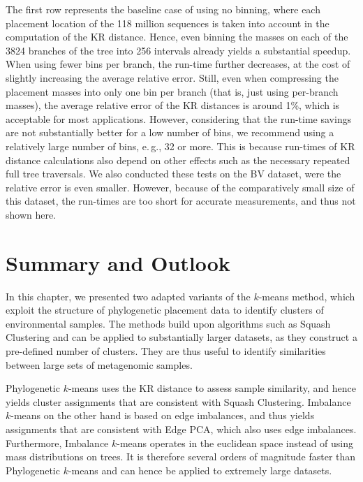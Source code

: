 The first row represents the baseline case of using no binning,
where each placement location of the \num{118} million sequences
is taken into account in the computation of the KR distance.
Hence, even binning the masses on each of the \num{3 824} branches of the tree into \num{256} intervals
already yields a substantial speedup.
When using fewer bins per branch, the run-time further decreases,
at the cost of slightly increasing the average relative error.
Still, even when compressing the placement masses into only one bin per branch (that is, just using per-branch masses),
the average relative error of the KR distances is around 1\%, which is acceptable for most applications.
However, considering that the run-time savings are not substantially better for a low number of bins,
we recommend using a relatively large number of bins, e.\,g., \num{32} or more.
This is because run-times of KR distance calculations also depend on other effects
such as the necessary repeated full tree traversals.
We also conducted these tests on the \ac{BV} dataset, were the relative error is even smaller.
However, because of the comparatively small size of this dataset, the run-times are too short for accurate measurements,
and thus not shown here.


\section{Summary and Outlook}
\label{ch:Clustering:sec:SummaryOutlook}

In this chapter, we presented two adapted variants of the $k$-means method,
which exploit the structure of phylogenetic placement data to identify clusters of environmental samples.
The methods build upon algorithms such as Squash Clustering and can be applied to substantially larger datasets,
as they construct a pre-defined number of clusters.
They are thus useful to identify similarities between large sets of metagenomic samples.

Phylogenetic $k$-means uses the KR distance to assess sample similarity,
and hence yields cluster assignments that are consistent with Squash Clustering.
Imbalance $k$-means on the other hand is based on edge imbalances,
and thus yields assignments that are consistent with Edge PCA, which also uses edge imbalances.
Furthermore, Imbalance $k$-means operates in the euclidean space instead of using mass distributions on trees.
It is therefore several orders of magnitude faster than Phylogenetic $k$-means
and can hence be applied to extremely large datasets.

